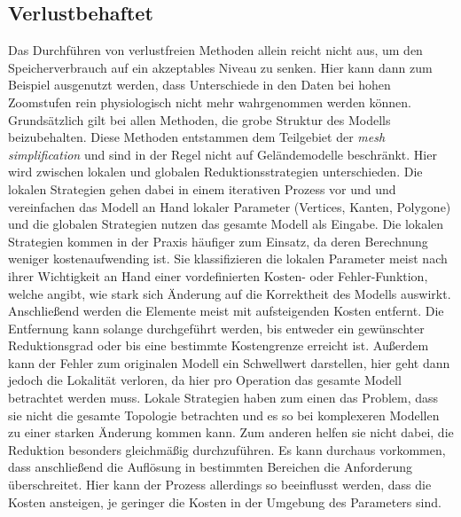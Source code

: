\subsection{Verlustbehaftet}
Das Durchführen von verlustfreien Methoden allein reicht nicht aus, um den Speicherverbrauch auf ein akzeptables Niveau zu senken. Hier kann dann zum Beispiel ausgenutzt werden, dass Unterschiede in den Daten bei hohen Zoomstufen rein physiologisch nicht mehr wahrgenommen werden können. Grundsätzlich gilt bei allen Methoden, die grobe Struktur des Modells beizubehalten. Diese Methoden entstammen dem Teilgebiet der \textit{mesh simplification} und sind in der Regel nicht auf Geländemodelle beschränkt. Hier wird zwischen lokalen und globalen Reduktionsstrategien unterschieden. Die lokalen Strategien gehen dabei in einem iterativen Prozess vor und und vereinfachen das Modell an Hand lokaler Parameter (Vertices, Kanten, Polygone) und die globalen Strategien nutzen das gesamte Modell als Eingabe. Die lokalen Strategien kommen in der Praxis häufiger zum Einsatz, da deren Berechnung weniger kostenaufwending ist. Sie klassifizieren die lokalen Parameter meist nach ihrer Wichtigkeit an Hand einer vordefinierten Kosten- oder Fehler-Funktion, welche angibt, wie stark sich Änderung auf die Korrektheit des Modells auswirkt. Anschließend werden die Elemente meist mit aufsteigenden Kosten entfernt. Die Entfernung kann solange durchgeführt werden, bis entweder ein gewünschter Reduktionsgrad oder bis eine bestimmte Kostengrenze erreicht ist. Außerdem kann der Fehler zum originalen Modell ein Schwellwert darstellen, hier geht dann jedoch die Lokalität verloren, da hier pro Operation das gesamte Modell betrachtet werden muss\cite[Abschnitt 3]{meshSimplSurvey}. Lokale Strategien haben zum einen das Problem, dass sie nicht die gesamte Topologie betrachten und es so bei komplexeren Modellen zu einer starken Änderung kommen kann. Zum anderen helfen sie nicht dabei, die Reduktion besonders gleichmäßig durchzuführen. Es kann durchaus vorkommen, dass anschließend die Auflösung in bestimmten Bereichen die Anforderung überschreitet. Hier kann der Prozess allerdings so beeinflusst werden, dass die Kosten ansteigen, je geringer die Kosten in der Umgebung des Parameters sind.

